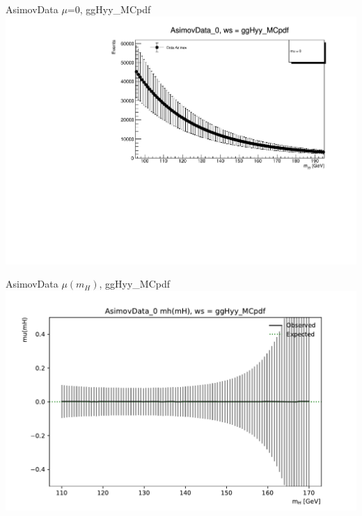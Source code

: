 \documentclass[10pt,UKenglish, leqno, xcolor = dvipsnames]{beamer}
\begin{document}
		\begin{frame}{AsimovData $\mu$=0, ggHyy\_MCpdf}
			\vfill
			\includegraphics[width=1.\textwidth]{../images/AsimovData_0_ggHyy_MCpdf.pdf}
			\vfill
		\end{frame}
	
		\begin{frame}{AsimovData $\mu(m_H)$, ggHyy\_MCpdf}
			\vfill
			\includegraphics[width=1.\textwidth]{../images/mu_AsimovData_0_ggHyy_MCpdf_plot.pdf}
			\vfill
		\end{frame}
	
\end{document}

